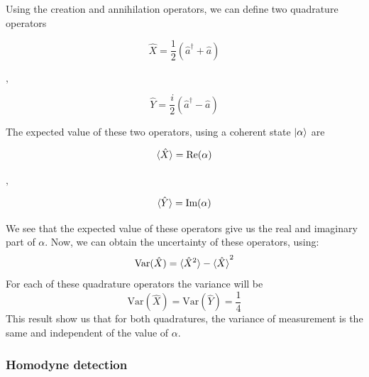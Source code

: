 %
%
Using the creation and annihilation operators, we can define two quadrature operators
\cite{loudon2000}
%
\begin{center}
	\begin{minipage}{41mm}
		\noindent
		\begin{equation}
			\hat{X} = \frac{1}{2} \left( \hat{a}^\dagger + \hat{a} \right)
		\end{equation}
	\end{minipage}
	$,\quad$
	\begin{minipage}{40mm}
		\noindent
		\begin{equation}
			\hat{Y} = \frac{i}{2} \left( \hat{a}^\dagger - \hat{a} \right)
		\end{equation}
	\end{minipage}
\end{center}
%
The expected value of these two operators, using a coherent state $\ket{\alpha}$ are
%
\begin{center}
	\begin{minipage}{37mm}
		\noindent
		\begin{equation}
			\braket{\hat{X}} = \textrm{Re}(\alpha)
		\end{equation}
	\end{minipage}
	$,\quad$
	\begin{minipage}{37mm}
		\noindent
		\begin{equation}
			\braket{\hat{Y}} = \textrm{Im}(\alpha)
		\end{equation}
	\end{minipage}
\end{center}
%
We see that the expected value of these operators give us the real and imaginary part of $\alpha$. Now, we can obtain the uncertainty of these operators, using:
%
\begin{equation}
\textrm{Var}(\hat{X}) = \braket{\hat{X}^2} - \braket{\hat{X}}^2
\end{equation}
%
For each of these quadrature operators the variance will be
%
\begin{equation}
\textrm{Var}(\hat{X}) = \textrm{Var}(\hat{Y}) = \frac{1}{4}
\end{equation}
%
This result show us that for both quadratures, the variance of measurement is the same and independent of the value of $\alpha$.
%
%
%
\subsubsection{Homodyne detection}

